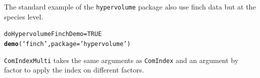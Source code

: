 \documentclass[12pt]{article}\usepackage[]{graphicx}\usepackage[]{color}
\makeatletter
\newcommand{\hlnum}[1]{\textcolor[rgb]{0.686,0.059,0.569}{#1}}%
\newcommand{\hlstr}[1]{\textcolor[rgb]{0.192,0.494,0.8}{#1}}%
\newcommand{\hlstd}[1]{\textcolor[rgb]{0.345,0.345,0.345}{#1}}%
\newcommand{\hlkwb}[1]{\textcolor[rgb]{0.69,0.353,0.396}{#1}}%
\newcommand{\hlkwc}[1]{\textcolor[rgb]{0.333,0.667,0.333}{#1}}%
\newcommand{\hlkwd}[1]{\textcolor[rgb]{0.737,0.353,0.396}{\textbf{#1}}}%
\newenvironment{kframe}{%
 \def\at@end@of@kframe{}%
 \ifinner\ifhmode%
  \def\at@end@of@kframe{\end{minipage}}%
  \begin{minipage}{\columnwidth}%
 \fi\fi%
 \def\FrameCommand##1{\hskip\@totalleftmargin \hskip-\fboxsep
 \colorbox{shadecolor}{##1}\hskip-\fboxsep
     \hskip-\linewidth \hskip-\@totalleftmargin \hskip\columnwidth}%
 \MakeFramed {\advance\hsize-\width
   \@totalleftmargin\z@ \linewidth\hsize
   \@setminipage}}%
 {\par\unskip\endMakeFramed%
 \at@end@of@kframe}
\newenvironment{knitrout}{}{} %
\makeatother
\begin{document}
The standard example of the \texttt{hypervolume} package also use finch data but at the species level.

\begin{knitrout}
\color{fgcolor}\begin{kframe}
\begin{alltt}
\hlstd{doHypervolumeFinchDemo}\hlkwb{=}\hlnum{TRUE}
\hlkwd{demo}\hlstd{(}\hlstr{'finch'}\hlstd{,} \hlkwc{package} \hlstd{=} \hlstr{'hypervolume'}\hlstd{)}
\end{alltt}
\end{kframe}
\end{knitrout}


\texttt{ComIndexMulti} takes the same arguments as \texttt{ComIndex} and an argument by factor to apply the index on different factors.
\label{hv.3}
\end{document}
